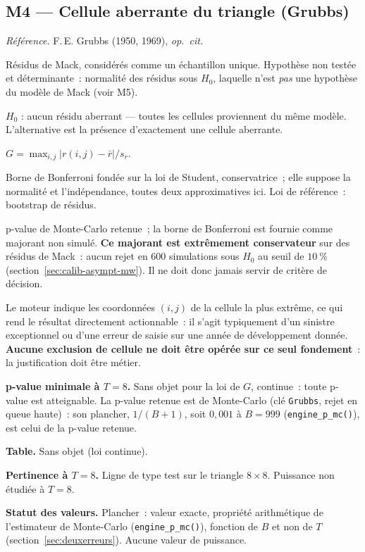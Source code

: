 \documentclass[a4paper,11pt]{article}
\newcommand{\code}[1]{\texttt{\small #1}}
\newcommand{\refl}[1]{{\small\textcolor{maincolor!70!black}{\textit{Référence.} #1}}\par\smallskip}
\newcounter{ficheid}
\newenvironment{fiche}[1]{%
  \stepcounter{ficheid}%
  \phantomsection
  \subsection{#1}%
  \label{fiche:\theficheid}%
}{%
  \end{description}\vspace{0.5em}%
}
\newcommand{\Cadre}{%
  \begin{description}[leftmargin=0pt, style=unboxed, itemsep=3pt, topsep=3pt, parsep=2pt]%
  \item[\textcolor{financeblue}{\textbf{1. Cadre, notations et hypothèses de validité (non testées).}}]}
\newcommand{\Hzero}{\item[\textcolor{financeblue}{\textbf{2. Hypothèse nulle.}}]}
\newcommand{\Stat}{\item[\textcolor{financeblue}{\textbf{3. Statistique de test.}}]}
\newcommand{\Loi}{\item[\textcolor{financeblue}{\textbf{4. Loi sous $H_0$.}}]}
\newcommand{\Pval}{\item[\textcolor{financeblue}{\textbf{5. p-value.}}]}
\newcommand{\Usage}{\item[\textcolor{financeblue}{\textbf{6. Usage et limites.}}]}
\newcommand{\Pertinence}{\item[\textcolor{financeblue}{\textbf{7. Pertinence et puissance à faible $T$.}}]}
\begin{document}
\begin{fiche}{M4 --- Cellule aberrante du triangle (Grubbs)}
\label{mw:m4gr}
\refl{F.\,E. Grubbs (1950, 1969), \emph{op.\ cit.}}
\Cadre
Résidus de Mack, considérés comme un échantillon unique. Hypothèse non testée et
déterminante~: normalité des résidus sous $H_0$, laquelle n'est \emph{pas} une
hypothèse du modèle de Mack (voir M5).
\Hzero
$H_0$ : aucun résidu aberrant --- toutes les cellules proviennent du même modèle.
L'alternative est la présence d'exactement une cellule aberrante.
\Stat
$G = \max_{i,j}\big|r(i,j) - \bar r\big| / s_r$.
\Loi
Borne de Bonferroni fondée sur la loi de Student, conservatrice~; elle suppose la
normalité et l'indépendance, toutes deux approximatives ici. Loi de référence~:
bootstrap de résidus.
\Pval
p-value de Monte-Carlo retenue~; la borne de Bonferroni est fournie comme
majorant non simulé. \textbf{Ce majorant est extrêmement conservateur} sur des
résidus de Mack~: aucun rejet en 600 simulations sous $H_0$ au seuil de $10~\%$
(section~\ref{sec:calib-asympt-mw}). Il ne doit donc jamais servir de critère de
décision.
\Usage
Le moteur indique les coordonnées $(i,j)$ de la cellule la plus extrême, ce qui
rend le résultat directement actionnable~: il s'agit typiquement d'un sinistre
exceptionnel ou d'une erreur de saisie sur une année de développement donnée.
\textbf{Aucune exclusion de cellule ne doit être opérée sur ce seul fondement}~:
la justification doit être métier.
\Pertinence
\textbf{p-value minimale à $T = 8$.} Sans objet pour la loi de $G$, continue~: toute p-value est atteignable. La p-value retenue est de Monte-Carlo (clé \code{Grubbs}, rejet en queue haute)~: son plancher, $1/(B+1)$, soit $0{,}001$ à $B = 999$ (\code{engine\_p\_mc()}), est celui de la p-value retenue.

\textbf{Table.} Sans objet (loi continue).

\textbf{Pertinence à $T = 8$.} Ligne de type test sur le triangle $8\times 8$. Puissance non étudiée à $T = 8$.

\textbf{Statut des valeurs.} Plancher~: valeur exacte, propriété arithmétique de l'estimateur de Monte-Carlo (\code{engine\_p\_mc()}), fonction de $B$ et non de $T$ (section~\ref{sec:deuxerreurs}). Aucune valeur de puissance.
\end{fiche}
\end{document}
